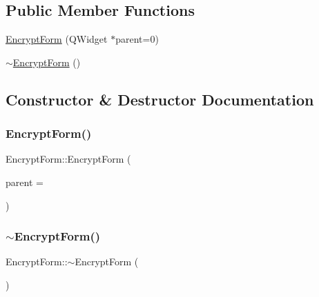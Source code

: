 \subsection*{Public Member Functions}
\begin{DoxyCompactItemize}
\item 
\hyperlink{class_encrypt_form_ac5cb0365d73aa360d7aba3a3ceab3d5b}{Encrypt\+Form} (Q\+Widget $\ast$parent=0)
\item 
\hyperlink{class_encrypt_form_ae816abae02f20b132d5eee2033849342}{$\sim$\+Encrypt\+Form} ()
\end{DoxyCompactItemize}


\subsection{Constructor \& Destructor Documentation}
\hypertarget{class_encrypt_form_ac5cb0365d73aa360d7aba3a3ceab3d5b}{}\label{class_encrypt_form_ac5cb0365d73aa360d7aba3a3ceab3d5b} 
\subsubsection{\texorpdfstring{Encrypt\+Form()}{EncryptForm()}}
{\footnotesize\ttfamily Encrypt\+Form\+::\+Encrypt\+Form (\begin{DoxyParamCaption}\item[{Q\+Widget $\ast$}]{parent = {} }\end{DoxyParamCaption})\hspace{0.3cm}{\ttfamily [explicit]}}

\hypertarget{class_encrypt_form_ae816abae02f20b132d5eee2033849342}{}\label{class_encrypt_form_ae816abae02f20b132d5eee2033849342} 
\subsubsection{\texorpdfstring{$\sim$\+Encrypt\+Form()}{~EncryptForm()}}
{\footnotesize\ttfamily Encrypt\+Form\+::$\sim$\+Encrypt\+Form (\begin{DoxyParamCaption}{ }\end{DoxyParamCaption})}

